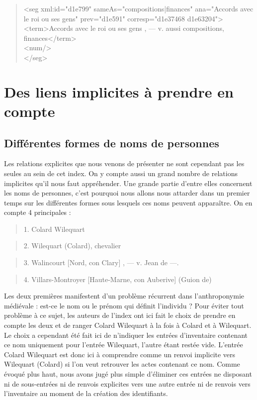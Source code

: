 \documentclass[a4paper,12pt,twoside]{book}
\begin{document}
	\begin{quotation}
               <seg xml:id="d1e799" sameAs="compositions|finances" ana="Accords avec le roi ou ses gens" prev="d1e591" corresp="d1e37468 d1e63204">\\
				\indent\indent<term>Accords avec le roi ou ses gens , — v. aussi compositions, finances</term>\\
				\indent\indent<num/>\\
				\indent</seg>
	\end{quotation}

	\section{Des liens implicites à prendre en compte}
	
	\subsection{Différentes formes de noms de personnes}
	
	Les relations explicites que nous venons de présenter ne sont cependant pas les seules au sein de cet index. On y compte aussi un grand nombre de relations implicites qu'il nous faut appréhender. Une grande partie d'entre elles concernent les noms de personnes, c'est pourquoi nous allons nous attarder dans un premier temps sur les différentes formes sous lesquels ces noms peuvent apparaître. On en compte 4 principales :
	
	\pagebreak
	
	\begin{quotation}
		1. Colard Wilequart
	\end{quotation}

	\begin{quotation}
		2. Wilequart (Colard), chevalier
	\end{quotation}

	\begin{quotation}
		3. Walincourt [Nord, con Clary] , — v. Jean de —.
	\end{quotation}

	\begin{quotation}
		4. Villars-Montroyer [Haute-Marne, con Auberive] (Guion	de)
	\end{quotation}
	
	\noindent Les deux premières manifestent d'un problème récurrent dans l'anthroponymie médiévale : est-ce le nom ou le prénom qui définit l'individu ? Pour éviter tout problème à ce sujet, les auteurs de l'index ont ici fait le choix de prendre en compte les deux et de ranger \og Colard Wilequart\fg{} à la fois à \og Colard\fg{} et à \og Wilequart\fg{}. Le choix a cependant été fait ici de n'indiquer les entrées d'inventaire contenant ce nom uniquement pour l'entrée \og Wilequart\fg{}, l'autre étant restée vide. L'entrée \og Colard Wilequart\fg{} est donc ici à comprendre comme un renvoi implicite vers \og Wilequart (Colard)\fg{} si l'on veut retrouver les actes contenant ce nom. Comme évoqué plus haut, nous avons jugé plus simple d'éliminer ces entrées ne disposant ni de sous-entrées ni de renvois explicites vers une autre entrée ni de renvois vers l'inventaire au moment de la création des identifiants.
	
\end{document}
